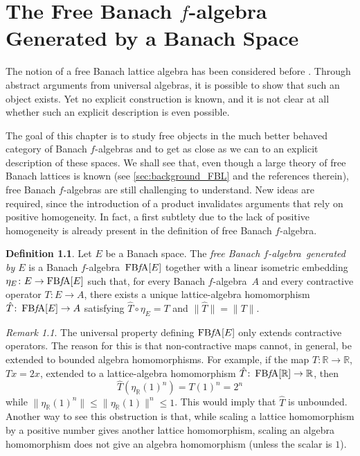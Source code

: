 \documentclass{memo-l}
\theoremstyle{definition}
\newtheorem{defn}[theorem]{Definition}
\theoremstyle{remark}
\newtheorem{rem}[theorem]{Remark}
\numberwithin{section}{chapter}
\numberwithin{equation}{chapter}
\newcommand\R{\ensuremath{\mathbb{R}}}
\newcommand{\falg}{$f\!$-algebra}
\newcommand{\FBFA}[1]{\operatorname{FB{\it f}\!A}[#1]}
\begin{document}
\chapter{The Free Banach \texorpdfstring{$f$-algebra}{f-algebra}
Generated by a Banach Space}
\label{sec:FBFA}

The notion of a free Banach lattice algebra has been considered
before \cite{wickstead2017_open, de_jeu2021}. Through abstract
arguments from universal algebras, it is possible to show that such
an object exists. Yet no explicit construction is known, and it is
not clear at all whether such an explicit description is even
possible.

The goal of this chapter is to study free objects in the much better
behaved category of Banach \falg s and to get as close as we can to an
explicit description of these spaces. We shall see that, even though a
large theory of free Banach lattices is known (see
\cref{sec:background_FBL} and the references therein), free Banach
\falg s are still challenging to understand. New ideas are required,
since the introduction of a product invalidates arguments that rely
on positive homogeneity. In fact, a first subtlety due to the lack of
positive homogeneity is already present in the definition of free
Banach \falg.

\begin{defn}
    Let $E$ be a Banach space. The \emph{free Banach \falg\ generated
    by $E$} is a Banach \falg\ $\FBFA E$ together with a linear isometric
    embedding $\eta _E \colon E\to \FBFA E$ such that, for every Banach
    \falg\ $A$ and every contractive operator $T\colon E\to A$, there exists a
    unique lattice-algebra homomorphism $\hat{T}\colon \FBFA E\to A$
    satisfying $\hat{T}\circ  \eta _E=T$ and $\|\hat{T}\|=\|T\|$.
\end{defn}

\begin{rem}
    The universal property defining $\FBFA E$ only extends
    contractive operators. The reason for this is that non-contractive
    maps cannot, in general, be extended to bounded algebra
    homomorphisms. For example, if the map
    $T\colon \R\to \R$, $Tx=2x$, extended to a lattice-algebra
    homomorphism $\hat{T}\colon \FBFA \R\to \R$, then
    \[
    \hat{T}(\eta _\R(1)^{n})=T(1)^{n}=2^{n}
    \]
    while $\|\eta _\R(1)^{n}\|\le \|\eta _\R(1)\|^{n}\le 1$. This
    would imply that $\hat{T}$ is unbounded. Another way to see this
    obstruction is that, while scaling a lattice homomorphism by a
    positive number gives another lattice homomorphism, scaling an
    algebra homomorphism does not give an algebra homomorphism (unless
    the scalar is $1$).
\end{rem}
\end{document}
